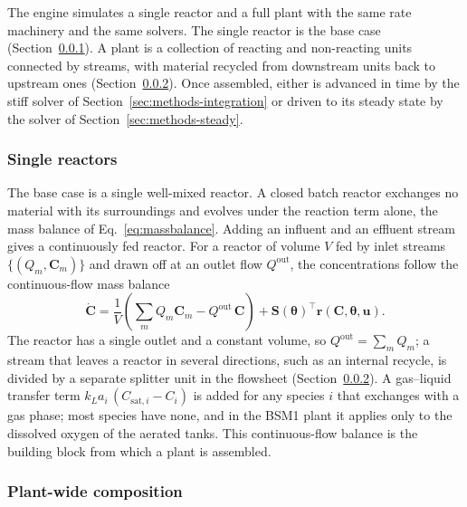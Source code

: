 \documentclass{article}
\begin{document}
The engine simulates a single reactor and a full plant with the same rate machinery and the same solvers. The single reactor is the base case (Section~\ref{sec:methods-reactor}). A plant is a collection of reacting and non-reacting units connected by streams, with material recycled from downstream units back to upstream ones (Section~\ref{sec:methods-plant}). Once assembled, either is advanced in time by the stiff solver of Section~\ref{sec:methods-integration} or driven to its steady state by the solver of Section~\ref{sec:methods-steady}.

\subsubsection{Single reactors}
\label{sec:methods-reactor}

The base case is a single well-mixed reactor. A closed batch reactor exchanges no material with its surroundings and evolves under the reaction term alone, the mass balance of Eq.~\eqref{eq:massbalance}. Adding an influent and an effluent stream gives a continuously fed reactor. For a reactor of volume \(V\) fed by inlet streams \(\{(Q_m,\mathbf{C}_m)\}\) and drawn off at an outlet flow \(Q^{\mathrm{out}}\), the concentrations follow the continuous-flow mass balance
\begin{equation}
  \dot{\mathbf{C}}
  = \frac{1}{V}\!\left(\sum_m Q_m \mathbf{C}_m - Q^{\mathrm{out}}\,\mathbf{C}\right)
    + \mathbf{S}(\boldsymbol{\theta})^\top \mathbf{r}(\mathbf{C}, \boldsymbol{\theta}, \mathbf{u}).
  \label{eq:cstr}
\end{equation}
The reactor has a single outlet and a constant volume, so \(Q^{\mathrm{out}}=\sum_m Q_m\); a stream that leaves a reactor in several directions, such as an internal recycle, is divided by a separate splitter unit in the flowsheet (Section~\ref{sec:methods-plant}). A gas--liquid transfer term \(k_La_i\,(C_{\mathrm{sat},i}-C_i)\) is added for any species \(i\) that exchanges with a gas phase; most species have none, and in the BSM1 plant it applies only to the dissolved oxygen of the aerated tanks. This continuous-flow balance is the building block from which a plant is assembled.

\subsubsection{Plant-wide composition}
\label{sec:methods-plant}
\end{document}
